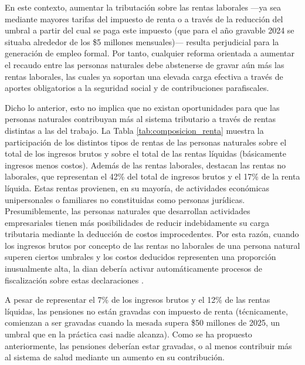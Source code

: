 En este contexto, aumentar la tributación sobre las rentas laborales —ya sea mediante mayores tarifas del impuesto de renta o a través de la reducción del umbral a partir del cual se paga este impuesto (que para el año gravable 2024 se situaba alrededor de los \$5 millones mensuales)— resulta perjudicial para la generación de empleo formal. Por tanto, cualquier reforma orientada a aumentar el recaudo entre las personas naturales debe abstenerse de gravar aún más las rentas laborales, las cuales ya soportan una elevada carga efectiva a través de aportes obligatorios a la seguridad social y de contribuciones parafiscales.



Dicho lo anterior, esto no implica que no existan oportunidades para que las personas naturales contribuyan más al sistema tributario a través de rentas distintas a las del trabajo. La Tabla \ref{tab:composicion_renta} muestra la participación de los distintos tipos de rentas de las personas naturales sobre el total de los ingresos brutos y sobre el total de las rentas líquidas (básicamente ingresos menos costos). Además de las rentas laborales, destacan las rentas no laborales, que representan el 42\% del total de ingresos brutos y el 17\% de la renta líquida. Estas rentas provienen, en su mayoría, de actividades económicas unipersonales o familiares no constituidas como personas jurídicas. Presumiblemente, las personas naturales que desarrollan actividades empresariales tienen más posibilidades de reducir indebidamente su carga tributaria mediante la deducción de costos improcedentes. Por esta razón, cuando los ingresos brutos por concepto de las rentas no laborales de una persona natural superen ciertos umbrales y los costos deducidos representen una proporción inusualmente alta, la \gls{dian} debería activar automáticamente procesos de fiscalización sobre estas declaraciones \parencite{Ofiscal2024proptrib}.

A pesar de representar el 7\% de los ingresos brutos y el 12\% de las rentas líquidas, las pensiones no están gravadas con impuesto de renta (técnicamente, comienzan a ser gravadas cuando la mesada supera \$50 millones de 2025, un umbral que en la práctica casi nadie alcanza). Como se ha propuesto anteriormente, las pensiones deberían estar gravadas, o al menos contribuir más al sistema de salud mediante un aumento en su contribución.

